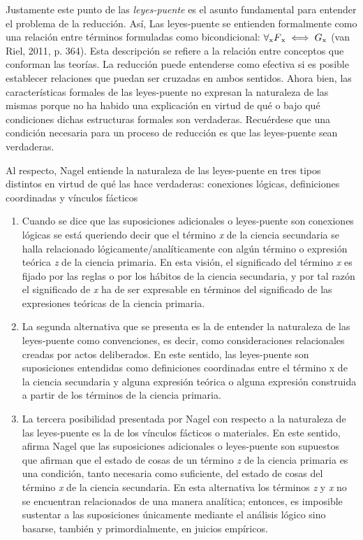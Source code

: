 \documentclass[]{book}
\begin{document}
\begin{refsection}
Justamente este punto de las \emph{leyes-puente} es el asunto
fundamental para entender el problema de la reducción. Así, Las
leyes-puente se entienden formalmente como una relación entre términos
formuladas como bicondicional: $\forall\textsubscript{x} F\textsubscript{x} \iff
G\textsubscript{x}$ (van Riel, 2011, p. 364). Esta descripción se
refiere a la relación entre conceptos que conforman las teorías. La
reducción puede entenderse como efectiva si es posible establecer
relaciones que puedan ser cruzadas en ambos sentidos. Ahora bien, las
características formales de las leyes-puente no expresan la naturaleza
de las mismas porque no ha habido una explicación en virtud de qué o
bajo qué condiciones dichas estructuras formales son verdaderas.
Recuérdese que una condición necesaria para un proceso de reducción es
que las leyes-puente sean verdaderas.

Al respecto, Nagel entiende la naturaleza de las leyes-puente en tres
tipos distintos en virtud de qué las hace verdaderas: conexiones
lógicas, definiciones coordinadas y vínculos fácticos

\begin{enumerate}
\def\labelenumi{(\arabic{enumi})}
\item
  Cuando se dice que las suposiciones adicionales o leyes-puente son
  conexiones lógicas se está queriendo decir que el término \emph{x} de
  la ciencia secundaria se halla relacionado lógicamente/analíticamente
  con algún término o expresión teórica \emph{z} de la ciencia primaria.
  En esta visión, el significado del término \emph{x} es fijado por las
  reglas o por los hábitos de la ciencia secundaria, y por tal razón el
  significado de \emph{x} ha de ser expresable en términos del
  significado de las expresiones teóricas de la ciencia primaria.
\item
  La segunda alternativa que se presenta es la de entender la naturaleza
  de las leyes-puente como convenciones, es decir, como consideraciones
  relacionales creadas por actos deliberados. En este sentido, las
  leyes-puente son suposiciones entendidas como definiciones coordinadas
  entre el término x de la ciencia secundaria y alguna expresión teórica
  o alguna expresión construida a partir de los términos de la ciencia
  primaria.
\item
  La tercera posibilidad presentada por Nagel con respecto a la
  naturaleza de las leyes-puente es la de los vínculos fácticos o
  materiales. En este sentido, afirma Nagel que las suposiciones
  adicionales o leyes-puente son supuestos que afirman que el estado de
  cosas de un término \emph{z} de la ciencia primaria es una condición,
  tanto necesaria como suficiente, del estado de cosas del término
  \emph{x} de la ciencia secundaria. En esta alternativa los términos
  \emph{z} y \emph{x} no se encuentran relacionados de una manera
  analítica; entonces, es imposible sustentar a las suposiciones
  únicamente mediante el análisis lógico sino basarse, también y
  primordialmente, en juicios empíricos.
\end{enumerate}


\end{refsection}
\end{document}
